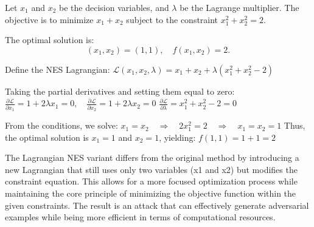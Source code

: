 Let \( x_1 \) and \( x_2 \) be the decision variables, and \( \lambda \) be the Lagrange multiplier. The objective is to minimize \( x_1 + x_2 \) subject to the constraint \( x_1^2 + x_2^2 = 2 \).

The optimal solution is:
\[
(x_1, x_2) = (1, 1), \quad f(x_1, x_2) = 2.
\]


Define the NES Lagrangian:
$\mathcal{L}(x_1, x_2, \lambda) = x_1 + x_2 + \lambda(x_1^2 + x_2^2 - 2)$

Taking the partial derivatives and setting them equal to zero:
 $\frac{\partial \mathcal{L}}{\partial x_1} = 1 + 2\lambda x_1 = 0, \quad 
 \frac{\partial \mathcal{L}}{\partial x_2} = 1 + 2\lambda x_2 = 0$
 $\frac{\partial \mathcal{L}}{\partial \lambda} = x_1^2 + x_2^2 - 2 = 0$

From the conditions, we solve:
$x_1 = x_2 \quad \Rightarrow \quad 2x_1^2 = 2 \quad \Rightarrow \quad x_1 = x_2 = 1$
Thus, the optimal solution is $x_1 = 1$ and $x_2 = 1$, yielding:
$f(1, 1) = 1 + 1 = 2$

The Lagrangian NES variant differs from the original method by introducing a new Lagrangian that still uses only two variables (x1 and x2) but modifies the constraint equation. This allows for a more focused optimization process while maintaining the core principle of minimizing the objective function within the given constraints. The result is an attack that can effectively generate adversarial examples while being more efficient in terms of computational resources.